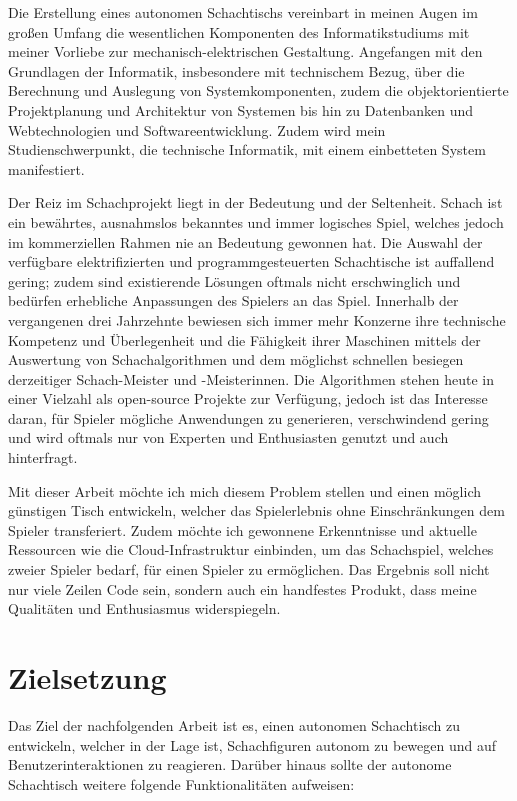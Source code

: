Die Erstellung eines autonomen Schachtischs vereinbart in meinen Augen
im großen Umfang die wesentlichen Komponenten des Informatikstudiums mit
meiner Vorliebe zur mechanisch-elektrischen Gestaltung. Angefangen mit
den Grundlagen der Informatik, insbesondere mit technischem Bezug, über
die Berechnung und Auslegung von Systemkomponenten, zudem die
objektorientierte Projektplanung und Architektur von Systemen bis hin zu
Datenbanken und Webtechnologien und Softwareentwicklung. Zudem wird mein
Studienschwerpunkt, die technische Informatik, mit einem einbetteten
System manifestiert.

Der Reiz im Schachprojekt liegt in der Bedeutung und der Seltenheit.
Schach ist ein bewährtes, ausnahmslos bekanntes und immer logisches
Spiel, welches jedoch im kommerziellen Rahmen nie an Bedeutung gewonnen
hat. Die Auswahl der verfügbare elektrifizierten und programmgesteuerten
Schachtische ist auffallend gering; zudem sind existierende Lösungen
oftmals nicht erschwinglich und bedürfen erhebliche Anpassungen des
Spielers an das Spiel. Innerhalb der vergangenen drei Jahrzehnte
bewiesen sich immer mehr Konzerne ihre technische Kompetenz und
Überlegenheit und die Fähigkeit ihrer Maschinen mittels der Auswertung
von Schachalgorithmen und dem möglichst schnellen besiegen derzeitiger
Schach-Meister und -Meisterinnen. Die Algorithmen stehen heute in einer
Vielzahl als open-source Projekte zur Verfügung, jedoch ist das
Interesse daran, für Spieler mögliche Anwendungen zu generieren,
verschwindend gering und wird oftmals nur von Experten und Enthusiasten
genutzt und auch hinterfragt.

Mit dieser Arbeit möchte ich mich diesem Problem stellen und einen
möglich günstigen Tisch entwickeln, welcher das Spielerlebnis ohne
Einschränkungen dem Spieler transferiert. Zudem möchte ich gewonnene
Erkenntnisse und aktuelle Ressourcen wie die Cloud-Infrastruktur
einbinden, um das Schachspiel, welches zweier Spieler bedarf, für einen
Spieler zu ermöglichen. Das Ergebnis soll nicht nur viele Zeilen Code
sein, sondern auch ein handfestes Produkt, dass meine Qualitäten und
Enthusiasmus widerspiegeln.

\hypertarget{zielsetzung}{%
\section{Zielsetzung}\label{zielsetzung}}

Das Ziel der nachfolgenden Arbeit ist es, einen autonomen Schachtisch zu
entwickeln, welcher in der Lage ist, Schachfiguren autonom zu bewegen
und auf Benutzerinteraktionen zu reagieren. Darüber hinaus sollte der
autonome Schachtisch weitere folgende Funktionalitäten aufweisen:


